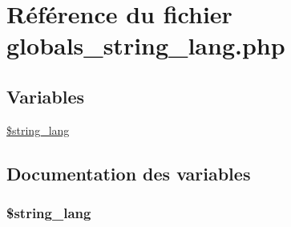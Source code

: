 \hypertarget{globals__string__lang_8php}{
\section{R\'{e}f\'{e}rence du fichier globals\_\-string\_\-lang.php}
\label{globals__string__lang_8php}
}
\subsection*{Variables}
\begin{CompactItemize}
\item 
\hyperlink{globals__string__lang_8php_a0}{\$string\_\-lang}
\end{CompactItemize}


\subsection{Documentation des variables}
\hypertarget{globals__string__lang_8php_a0}{
\subsubsection[\$string\_\-lang]{\setlength{\rightskip}{0pt plus 5cm}\$string\_\-lang}}
\label{globals__string__lang_8php_a0}


